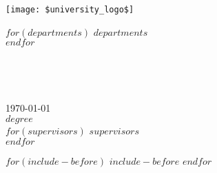 \documentclass[twoside,openright,titlepage,numbers=noenddot,headinclude=True,parts,
                footinclude=false,cleardoublepage=empty,abstractoff,
                dvipsnames,
                BCOR={{ BCOR }},fontsize={{ fontsize }},{{ language }},
                ]{$documentclass$}
\renewcommand\bibname{$bibtitle$}
\begin{document}
\frenchspacing
\raggedbottom
\pagestyle{plain}



\begin{titlepage}
  \begin{addmargin}[-1cm]{-3cm}
    \begin{center}
      \large
      \hfill

      \texttt{[image: \$university\_logo\$]} \\
      \bigskip

      $for(departments)$
        $departments$\\ \medskip
      $endfor$

      \vfill

      \Large
       \\
      \bigskip

      \begingroup
        \LARGE
        \color{Maroon} \\
        \bigskip
      \endgroup

      \Large

      \vfill
    \end{center}

    \today \\
    $degree$ \\
    $for(supervisors)$
      $supervisors$\\
    $endfor$


  \end{addmargin}
\end{titlepage}

\pagestyle{scrheadings}

$for(include-before)$
$include-before$
$endfor$

\pagestyle{scrheadings}
\end{document}

